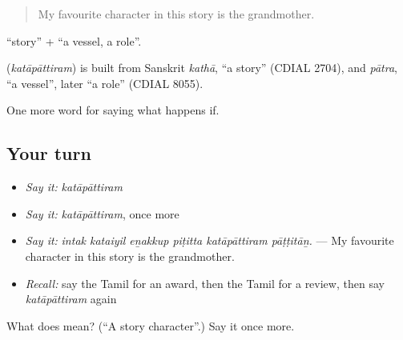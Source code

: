 \begin{quote}
My favourite character in this story is the grandmother.
\end{quote}

 \textquotedblleft{}story\textquotedblright{} +  \textquotedblleft{}a vessel, a role\textquotedblright{}.

\begin{cousinweb}
\textbf{} (\emph{katāpāttiram}) is built from Sanskrit \emph{kathā}, \textquotedblleft{}a story\textquotedblright{} (CDIAL 2704), and \emph{pātra}, \textquotedblleft{}a vessel\textquotedblright{}, later \textquotedblleft{}a role\textquotedblright{} (CDIAL 8055).
\end{cousinweb}

\begin{grammarlens}[title={What you've built}]
One more word for saying what happens if.
\end{grammarlens}

\subsection*{Your turn}
\begin{itemize}
\raggedright
  \item \emph{Say it:} \emph{katāpāttiram}
  \item \emph{Say it:} \emph{katāpāttiram}, once more
  \item \emph{Say it:} \emph{intak kataiyil eṉakkup piṭitta katāpāttiram pāṭṭitāṉ.} — My favourite character in this story is the grandmother.
  \item \emph{Recall:} say the Tamil for an award, then the Tamil for a review, then say \emph{katāpāttiram} again
\end{itemize}

\begin{tcolorbox}[breakable,colback=teal!4,colframe=teal!35!black,title={Before you move on}]
What does  mean? (\textquotedblleft{}A story character\textquotedblright{}.) Say it once more.
\end{tcolorbox}
